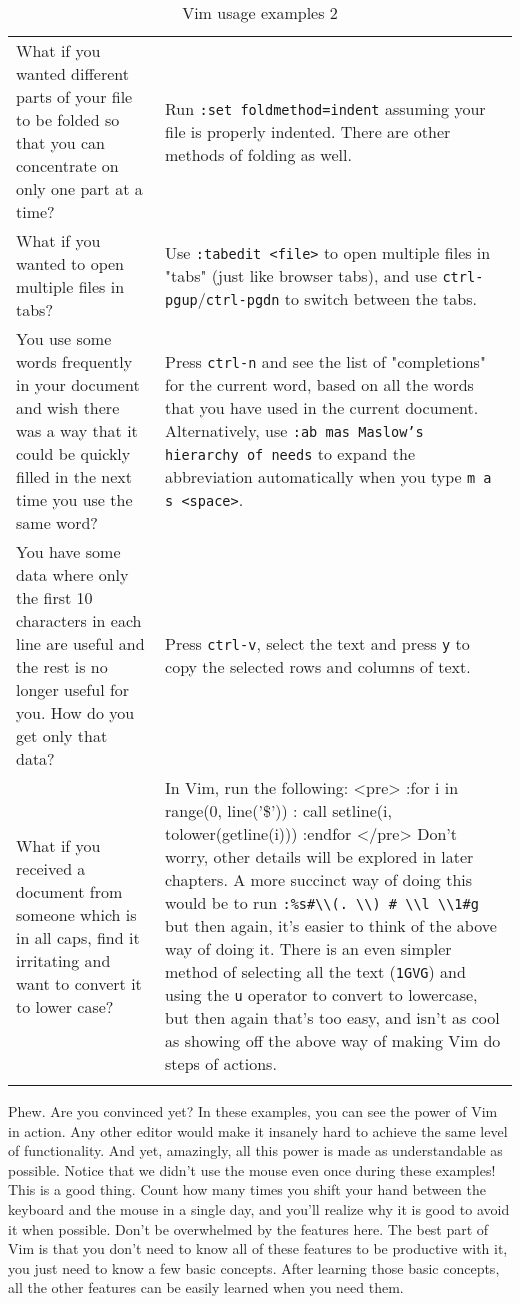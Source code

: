 \begin{table*}[H]
	\begin{tabular}{p{6cm}| p{7.5cm}}
What if you wanted different parts of your file to be folded so that you can 
concentrate on only one part at a time? & Run \texttt{:set foldmethod=indent} 
assuming your file is properly indented. There are other methods of folding as 
well. \\ 
What if you wanted to open multiple files in tabs?  & Use \texttt{:tabedit
<file>} to open multiple files in "tabs" (just like browser tabs), and
use \texttt{ctrl-pgup}/\texttt{ctrl-pgdn} to switch between the tabs. \\ 
You use some words frequently in your document and wish there was a way that it
could be quickly filled in the next time you use the same word? & Press
\texttt{ctrl-n} and see the list of "completions" for the current word, based
on all the words that you have used in the current document. Alternatively, use
\texttt{:ab mas Maslow's hierarchy of needs} to expand the abbreviation
automatically when you type \texttt{m a s <space>}. \\ 
You have some data where only the first 10 characters in each line are useful
and the rest is no longer useful for you. How do you get only that data? &
Press \texttt{ctrl-v}, select the text and press \texttt{y} to copy the
selected rows and columns of text. \\ 
What if you received a document from someone which is in all caps, find it
irritating and want to convert it to lower case? & In Vim, run the following:
<pre> :for i in range(0, line('\$')) : call setline(i, tolower(getline(i)))
:endfor </pre> Don't worry, other details will be explored in later chapters. A
more succinct way of doing this would be to run
\texttt{:\%s\#\textbackslash \textbackslash (. \textbackslash \textbackslash ) \# \textbackslash \textbackslash l
\textbackslash \textbackslash 1\#g}
but then again, it's easier to think of the above way of doing it. There is an
even simpler method of selecting all the text (\texttt{1GVG}) and using the
\texttt{u} operator to convert to lowercase, but then again that's too easy,
and isn't as cool as showing off the above way of making Vim do steps
of actions. \\
	\caption{Vim usage examples 2}
	\label{tab:vimusageexample2}
\end{tabular}
\end{table*}
Phew. Are you convinced yet? In these examples, you can see the power of Vim in
action. Any other editor would make it insanely hard to achieve the same level
of functionality. And yet, amazingly, all this power is made as understandable
as possible. Notice that we didn't use the mouse even once during these
examples! This is a good thing.  Count how many times you shift your hand
between the keyboard and the mouse in a single day, and you'll realize why it
is good to avoid it when possible.  Don't be overwhelmed by the features here.
The best part of Vim is that you don't need to know all of these features to be
productive with it, you just need to know a few basic concepts. After learning
those basic concepts, all the other features can be easily learned when you
need them.
